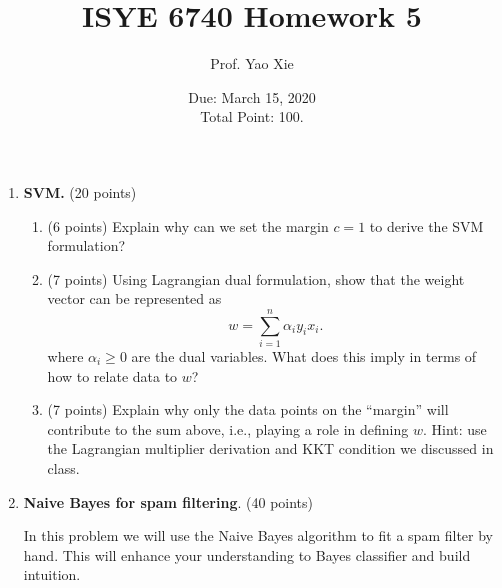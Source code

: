 \documentclass[twoside,12pt]{article}
\begin{document}
\title{ISYE 6740 Homework 5}
\author{Prof. Yao Xie}
\date{Due: March 15, 2020 \\Total Point: 100.}
\maketitle



\begin{enumerate}

\item{\bf SVM. } (20 points)

\begin{enumerate}
\item (6 points) Explain why can we set the margin $c = 1$ to derive the SVM formulation?
\item (7 points) Using Lagrangian dual formulation, show that the weight vector can be represented as
\[
w = \sum_{i=1}^n \alpha_i y_i x_i.
\]
where $\alpha_i \geq 0$ are the dual variables. What does this imply in terms of how to relate data to $w$?
\item (7 points) Explain why only the data points on the ``margin'' will contribute to the sum above, i.e., playing a role in defining $w$. Hint: use the Lagrangian multiplier derivation and KKT condition we discussed in class. 

\end{enumerate}


\clearpage

\item {\bf Naive Bayes for spam filtering}. (40 points) 

In this problem we will use the Naive Bayes algorithm to fit a spam filter by hand. This will enhance your understanding to Bayes classifier and build intuition. 


\end{enumerate}
\end{document}
